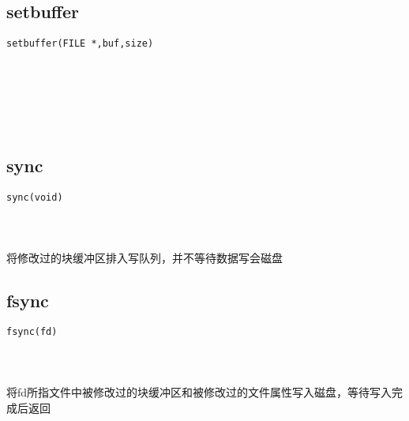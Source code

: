 \documentclass[10pt,a4paper]{article}
\begin{document}
\subsection{setbuffer}
\begin{spacing}{2.0}
\lstset{language=C,numbers=none}
\begin{lstlisting}
setbuffer(FILE *,buf,size)
\end{lstlisting}
{\large\color[rgb]{0.2,0.4,0.6}{*:}} \\
{\large\color[rgb]{0.2,0.4,0.6}{buf:}} \\
{\large\color[rgb]{0.2,0.4,0.6}{size:}}
\paragraph{ \ \ }
\end{spacing}

\section{\color[rgb]{0.2,0.4,0.6}{磁盘同步}}
\subsection{sync}
\begin{spacing}{2.0}
\lstset{language=C,numbers=none}
\begin{lstlisting}
sync(void)
\end{lstlisting}
{\large\color[rgb]{0.2,0.4,0.6}{void:}}
\paragraph{ \ \ }将修改过的块缓冲区排入写队列，并不等待数据写会磁盘
\end{spacing}

\subsection{fsync}
\begin{spacing}{2.0}
\lstset{language=C,numbers=none}
\begin{lstlisting}
fsync(fd)
\end{lstlisting}
{\large\color[rgb]{0.2,0.4,0.6}{fd:}}
\paragraph{ \ \ }将fd所指文件中被修改过的块缓冲区和被修改过的文件属性写入磁盘，等待写入完成后返回
\end{spacing}
\end{document}
